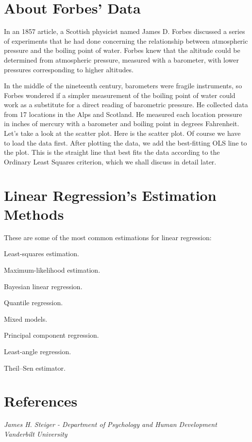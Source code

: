 \documentclass{article}
\begin{document}
\section {About Forbes' Data}
    
    In an 1857 article, a Scottish physicist named James D. Forbes discussed a series of experiments that he had done concerning the relationship between atmospheric pressure and the boiling point of water. Forbes knew that the altitude could be determined from atmospheric pressure, measured with a barometer, with lower pressures corresponding to higher altitudes.
    
    In the middle of the nineteenth century, barometers were fragile instruments, so Forbes wondered if a simpler measurement of the boiling point of water could work as a substitute for a direct reading of barometric pressure. He collected data from 17 locations in the Alps and Scotland. He measured each location pressure in inches of mercury with a barometer and boiling point in degrees Fahrenheit. Let’s take a look at the scatter plot. Here is the scatter plot. %
    Of course we have to load the data first. After plotting the data, we add the best-fitting OLS line to the plot. This is the straight line that best fits the data according to the Ordinary Least Squares criterion, which we shall discuss in detail later.
    
\section {Linear Regression's Estimation Methods}
    
    These are some of the most common estimations for linear regression: 

    Least-squares estimation.
    
    Maximum-likelihood estimation.
    
    Bayesian linear regression.
    
    Quantile regression.
    
    Mixed models.
    
    Principal component regression.
    
    Least-angle regression.
    
    Theil–Sen estimator.
    
    \vspace{\baselineskip}
    
\section {References}
    \textit{James H. Steiger - Department of Psychology and Human Development Vanderbilt University}
%   
%    
%    
\end{document}
